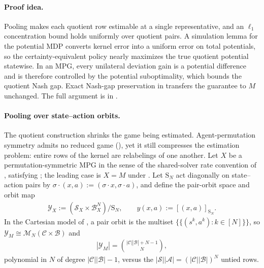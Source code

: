 \documentclass{article}
\theoremstyle{plain}
\theoremstyle{definition}
\theoremstyle{remark}
\newcommand{\St}{\mathcal{S}}
\newcommand{\Ac}{\mathcal{A}}
\newcommand{\abs}[1]{\left\lvert#1\right\rvert}
\newcommand{\orbit}[1]{[#1]}
\newcommand{\Sym}{\mathrm{S}}
\begin{document}
\paragraph{Proof idea.}
Pooling makes each quotient row estimable at a single representative, and an
$\ell_1$ concentration bound holds uniformly over quotient pairs. A simulation
lemma for the potential MDP converts kernel error into a uniform error on
total potentials, so the certainty-equivalent policy nearly maximizes the true
quotient potential statewise. In an MPG, every unilateral deviation gain is a
potential difference and is therefore controlled by the potential
suboptimality, which bounds the quotient Nash gap. Exact Nash-gap preservation
in  transfers the guarantee to $M$ unchanged. The
full argument is in .

\paragraph{Pooling over state--action orbits.}
The quotient construction shrinks the game being estimated. Agent-permutation
symmetry admits no reduced game (), yet it
still compresses the estimation problem: entire rows of the kernel are
relabelings of one another. Let $X$ be a permutation-symmetric MPG in the
sense of the shared-solver rate convention of ,
satisfying ; the leading case is $X=M$ under
. Let $\Sym_N$ act diagonally on
state--action pairs by
$\sigma\mathbin{\cdot}(x,a):=(\sigma\mathbin{\cdot}x,\sigma\mathbin{\cdot}a)$,
and define the pair-orbit space and orbit map
\begin{align*}
  \mathcal Y_X
  :=
  (\mathcal S_X\times\mathcal B_X^N)/\Sym_N,
  \qquad
  y(x,a)
  :=
  \orbit{(x,a)}_{\Sym_N}.
\end{align*}
In the Cartesian model of , a pair
orbit is the multiset $\{\!\{(s^k,a^k):k\in[N]\}\!\}$, so
$\mathcal Y_M\cong\mathcal M_N(\mathcal C\times\mathcal B)$ and
\begin{align*}
  \abs{\mathcal Y_M}
  =
  \binom{\abs{\mathcal C}\abs{\mathcal B}+N-1}{N},
\end{align*}
polynomial in $N$ of degree $\abs{\mathcal C}\abs{\mathcal B}-1$, versus the
$\abs\St\abs\Ac=(\abs{\mathcal C}\abs{\mathcal B})^N$ untied rows.
\end{document}
